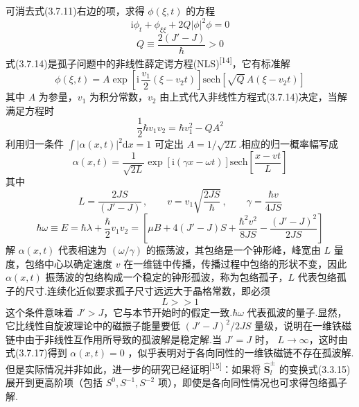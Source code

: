 可消去式(3.7.11)右边的项，求得 $\phi\left(\xi,t\right)$ 的方程
\begin{equation*}
  \mathrm{i}\phi_t+\phi_{\xi\xi}+2Q\left|\phi\right|^2\phi=0
\end{equation*}
\begin{equation}
  Q\equiv\frac{2\left(J'-J\right)}{\hbar}>0
\end{equation}
式(3.7.14)是孤子问题中的非线性薛定谔方程(NLS)\textsuperscript{[14]}，它有标准解
\begin{equation}
  \phi\left(\xi,t\right)=A\exp\left[\mathrm{i}\,\frac{v_1}{2}\left(\xi-v_2t\right)\right]
  \mathrm{sech}\left[\sqrt{Q}\,A\left(\xi-v_2t\right)\right]
\end{equation}
其中 $A$ 为参量，$v_1$ 为积分常数，$v_2$
由上式代入非线性方程式(3.7.14)决定，当解满足方程时
\begin{equation}
  \frac{1}{2}\hbar v_1v_2=\hbar v_1^2-QA^2
\end{equation}
利用归一条件 $\int\left|\alpha\left(x,t\right)\right|^2\mathrm{d}x=1$ 可定出
$A=1/\sqrt{2L}$.相应的归一概率幅写成
\begin{equation}
  \alpha\left(x,t\right)=\frac{1}{\sqrt{2L}}
  \exp\left[\mathrm{i}\left(\gamma x-\omega t\right)\right]
  \mathrm{sech}\left[\frac{x-vt}{L}\right]
\end{equation}
其中
\begin{equation}
  L=\frac{2JS}{\left(J'-J\right)}\,,\qquad
  v=v_1\sqrt{\frac{2JS}{\hbar}}\,,\qquad
  \gamma=\frac{\hbar v}{4JS}
\end{equation}
\begin{equation}
  \hbar\omega\equiv E=\hbar\lambda+\frac{\hbar}{2}v_1v_2
  =\left[\mu B+4\left(J'-J\right)S+\frac{\hbar^2v^2}{8JS}
  -\frac{\left(J'-J\right)^2}{2JS}\right]
\end{equation}
解 $\alpha\left(x,t\right)$
代表相速为 $\left(\omega/\gamma\right)$
的振荡波，其包络是一个钟形峰，峰宽由 $L$
量度，包络中心以确定速度 $v$
在一维链中传播，传播过程中包络的形状不变，因此 $\alpha\left(x,t\right)$
振荡波的包络构成一个稳定的钟形孤波，称为包络孤子，$L$
代表包络孤子的尺寸.连续化近似要求孤子尺寸远远大于晶格常数，即必须
\begin{equation}
  L>\!>1
\end{equation}
这个条件意味着 $J'>J$，它与本节开始时的假定一致.$\hbar\omega$
代表孤波的量子.显然，它比线性自旋波理论中的磁振子能量要低
$\left(J'-J\right)^2/2JS$
量级，说明在一维铁磁链中由于非线性互作用所导致的孤波解是稳定解.当 $J'=J$ 时，
$L\rightarrow\infty$，这时由式(3.7.17)得到 $\alpha\left(x,t\right)=0$
，似乎表明对于各向同性的一维铁磁链不存在孤波解.但是实际情况并非如此，进一步的研究已经证明\textsuperscript{[15]}：如果将
$\hat{\boldsymbol{S}}_l^{\pm}$
的变换式(3.3.15)展开到更高阶项（包括 $S^0,S^{-1},S^{-2}$
项），即使是各向同性情况也可求得包络孤子解.

